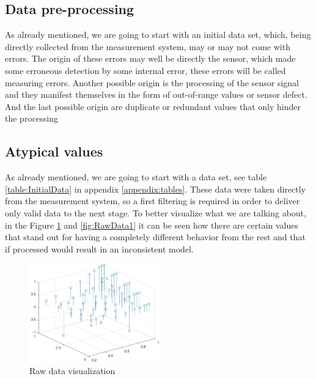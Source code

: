 \documentclass{article}
\begin{document}
\begin{doublespacing}

\newpage
\section{Data pre-processing}

\par As already mentioned, we are going to start with an initial data set, which, being directly collected from the measurement system, may or may not come with errors. The origin of these errors may well be directly the sensor, which made some erroneous detection by some internal error, these errors will be called measuring errors. Another possible origin is the processing of the sensor signal and they manifest themselves in the form of out-of-range values or sensor defect. And the last possible origin are duplicate or redundant values that only hinder the processing



\subsection{Atypical values}

\par As already mentioned, we are going to start with a data set, see table \ref{table:InitialData} in appendix \ref{appendix:tables}. These data were taken directly from the measurement system, so a first filtering is required in order to deliver only valid data to the next stage. To better visualize what we are talking about, in the Figure \ref{fig:RawData2} and \ref{fig:RawData1} it can be seen how there are certain values that stand out for having a completely different behavior from the rest and that if processed would result in an inconsistent model.

\begin{figure}[H] 
    \centering
    \includegraphics[width=0.5\textwidth]{Images/RawData2.JPG} 
    \caption{Raw data visualization} 
    \label{fig:RawData2} 
\end{figure}


\end{doublespacing}
\end{document}
